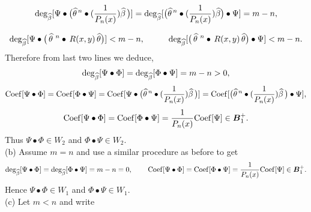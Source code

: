 \documentclass[10pt]{article}
\newcommand{\be}{\begin{equation}}
\newcommand{\ee}{\end{equation}}
\newcommand{\nn}{\nonumber}
\newcommand{\PP}{\boldsymbol{B}^{+}_1}
\newcommand{\Deg}{\rm deg_{\widehat{\beta}}}
\newcommand{\Cof}{\rm Coef}
\begin{document}
{{\begin{itemize}
{{\be {\rm deg_{\widehat{\beta}}}[\Psi\bullet\big(\widehat{\theta}^{\,
n}\bullet({1\over P_{n}(x)}){\widehat{\beta}}\,\big)]= {\rm
deg_{\widehat{\beta}}}[\big(\widehat{\theta}^{\, n}\bullet({1\over
P_{n}(x)}){\widehat{\beta}}\big)\bullet\Psi]= m-n,
\label{karbas1}\nn\ee

\be {\rm
deg_{\widehat{\beta}}}[\Psi\bullet\big(\,\widehat{\theta}\,^{\,
n}\bullet\,R(x,y)\,\widehat{\theta}\big)]< m-n,\hspace{1cm} {\rm
deg_{\widehat{\beta}}}[\big(\,\widehat{\theta}\,^{\,
n}\bullet\,R(x,y)\,\widehat{\theta}\big)\bullet \Psi]<
m-n.\label{karbas2}\nn\ee Therefore from last two lines we deduce,
\be {\Deg}[\Psi\bullet\Phi]={\Deg}[\Phi\bullet\Psi]=m-n>0,\nn\ee \be
{\rm Coef}[\Psi\bullet\Phi]=
 {\rm Coef}[\Phi\bullet\Psi]={\Cof}[\Psi\bullet\big(\widehat{\theta}^{\,
n}\bullet({1\over P_{n}(x)}){\widehat{\beta}}\,\big)]=
{\Cof}[\big(\widehat{\theta}^{\, n}\bullet({1\over
P_{n}(x)}){\widehat{\beta}}\,\big)\bullet\Psi],\nn\ee  \be {\rm
Coef}[\Psi\bullet\Phi]=
 {\rm Coef}[\Phi\bullet\Psi]={1\over P_{n}(x)}{\rm Coef}[\Psi]\in \PP.\nn \ee
Thus $\Psi\bullet\Phi \in W_2$ and $\Phi\bullet\Psi \in \nn W_2$.\\

(b) Assume $m=n$ and use a similar procedure as before to get \be
{\Deg}[\Psi\bullet\Phi]={\Deg}[\Phi\bullet\Psi]=m-n=0,\hspace{0.75cm}
{\rm Coef}[\Psi\bullet\Phi]=
 {\rm Coef}[\Phi\bullet\Psi]={1\over P_{n}(x)}{\rm Coef}[\Psi]\in \PP.\nn \ee Hence $ \Psi\bullet\Phi \in W_1$ and $\Phi\bullet\Psi \in
 W_1$.\\

(c) Let $m<n$ and write

}}
\end{itemize}}}
\end{document}

